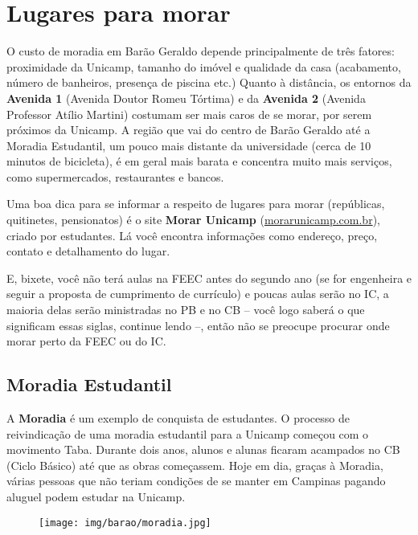 
\section{Lugares para morar}

O custo de moradia em Barão Geraldo depende principalmente de três fatores:
proximidade da Unicamp, tamanho do imóvel e qualidade da casa (acabamento,
número de banheiros, presença de piscina etc.) Quanto à distância, os entornos
da \textbf{Avenida 1} (Avenida Doutor Romeu Tórtima) e da \textbf{Avenida 2}
(Avenida Professor Atílio Martini) costumam ser mais caros de se morar, por
serem próximos da Unicamp. A região que vai do centro de Barão Geraldo até a
Moradia Estudantil, um pouco mais distante da universidade (cerca de 10 minutos
de bicicleta), é em geral mais barata e concentra muito mais serviços, como
supermercados, restaurantes e bancos.

Uma boa dica para se informar a respeito de lugares para morar (repúblicas,
quitinetes, pensionatos) é o site \textbf{Morar Unicamp}
(\url{morarunicamp.com.br}), criado por estudantes. Lá você encontra
informações como endereço, preço, contato e detalhamento do lugar.

E, bixete, você não terá aulas na FEEC antes do segundo ano (se for engenheira
e seguir a proposta de cumprimento de currículo) e poucas aulas serão no IC, a
maioria delas serão ministradas no PB e no CB -- você logo saberá o que
significam essas siglas, continue lendo --, então não se preocupe procurar onde
morar perto da FEEC ou do IC.

\subsection{Moradia Estudantil}

A \textbf{Moradia} é um exemplo de conquista de estudantes. O processo de
reivindicação de uma moradia estudantil para a Unicamp começou com o movimento
Taba. Durante dois anos, alunos e alunas ficaram acampados no CB (Ciclo Básico)
até que as obras começassem. Hoje em dia, graças à Moradia, várias pessoas que
não teriam condições de se manter em Campinas pagando aluguel podem estudar na
Unicamp.

\begin{figure}[h!]
    \centering
    \texttt{[image: img/barao/moradia.jpg]}
\end{figure}


